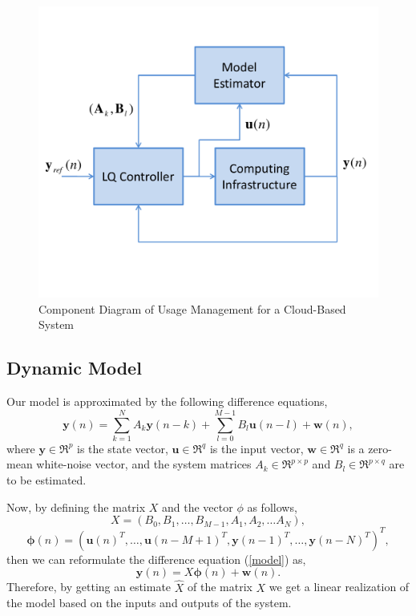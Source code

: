 \documentclass{acm_proc_article-sp}
\begin{document}
\begin{figure}[h]
  \begin{center}
    \includegraphics[width=.49\textwidth]{Fig_Closed_Loop}
  \end{center}
  \caption{Component Diagram of Usage Management for a Cloud-Based System}
  \label{fig:convergence}
\end{figure}

\subsection{Dynamic Model}
Our model is approximated by the following difference equations,
\begin{equation}
 \mathbf{y}(n) = \sum_{k=1}^{N}A_{k}\mathbf{y}(n-k)+ \sum_{l=0}^{M-1}B_{l}\mathbf{u}(n-l) + \mathbf{w}(n),
 \label{model}
\end{equation}
where $\mathbf{y} \in \Re^{p}$ is the state vector, $\mathbf{u} \in \Re^{q}$ is the input vector, 
$\mathbf{w} \in \Re^{q}$ is a zero-mean white-noise vector, 
and the system matrices $A_{k} \in \Re^{p \times p}$ and $B_{l} \in \Re^{p \times q}$ 
are to be estimated.

Now, by defining the matrix $X$ and the vector $\phi$ as follows,
\begin{equation}
 X = \left( B_{0},B_{1},\ldots,B_{M-1},A_{1},A_{2},\ldots A_{N} \right),
 \label{system}
\end{equation}
\begin{displaymath}
 \mathbf{\phi}(n) = ( \mathbf{u}(n)^{T},\ldots,\mathbf{u}(n-M+1)^{T},\mathbf{y}(n-1)^{T},\dots,\mathbf{y}(n-N)^{T})^{T},
\end{displaymath}
then we can reformulate the difference equation (\ref{model}) as,
\begin{displaymath}
\mathbf{y}(n) = X\mathbf{\phi}(n) + \mathbf{w}(n).
\end{displaymath}
Therefore, by getting an estimate $\hat{X}$ of the matrix $X$ we get a linear realization of the model based on the inputs
and outputs of the system.
\end{document}
